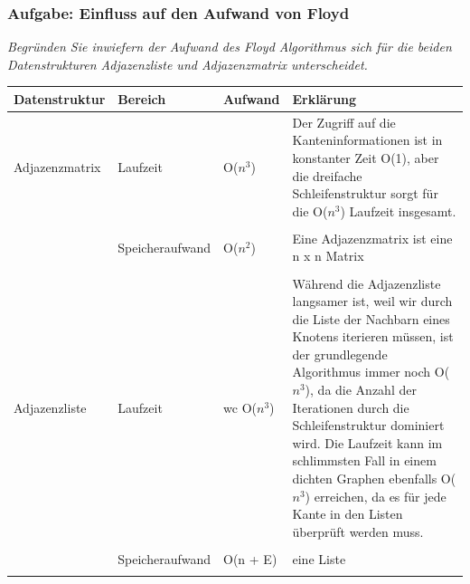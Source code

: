 \documentclass{article}
\begin{document}
\newpage
\subsubsection{Aufgabe: Einfluss auf den Aufwand von Floyd \textcolor{ForestGreen}{\CheckmarkBold}}
\textit{Begründen Sie inwiefern der Aufwand des Floyd Algorithmus  sich für die beiden Datenstrukturen Adjazenzliste  und Adjazenzmatrix  unterscheidet.}  \cite{probeklausur21} \cite{probeklausur24}
\begin{table}[H]
    \centering
    \begin{tabular}{p{2.5cm} | p{2.5cm} p{1.5cm} p{8cm}} 
          \textbf{Datenstruktur} & \textbf{Bereich} & \textbf{Aufwand} & \textbf{Erklärung}  \\ \hline  
        Adjazenzmatrix\index{Adjazenzmatrix} & Laufzeit & O($n^3$)  & Der Zugriff auf die Kanteninformationen ist in konstanter Zeit O(1), aber die dreifache Schleifenstruktur sorgt für die O($n^3$) Laufzeit insgesamt. \\ \\
        & Speicheraufwand & O($n^2$)  & Eine Adjazenzmatrix ist eine n x n Matrix \\ \\  
         Adjazenzliste \index{Adjazenzliste}  & Laufzeit & wc O($n^3$) & Während die Adjazenzliste langsamer ist, weil wir durch die Liste der Nachbarn eines Knotens iterieren müssen, ist der grundlegende Algorithmus immer noch O($n^3$), da die Anzahl der Iterationen durch die Schleifenstruktur dominiert wird. Die Laufzeit kann im schlimmsten Fall in einem dichten Graphen ebenfalls O($n^3$) erreichen, da es für jede Kante in den Listen überprüft werden muss. \\ \\
        & Speicheraufwand & O(n + E)  & eine Liste \\ \\
    \end{tabular}
    \label{tab:my_ref}
\end{table}
 

\newpage
\end{document}
